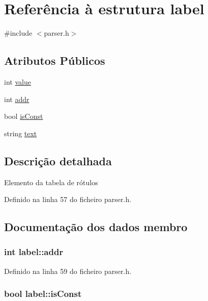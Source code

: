 \hypertarget{structlabel}{\section{Referência à estrutura label}
\label{structlabel}
}


{\ttfamily \#include $<$parser.\-h$>$}

\subsection*{Atributos Públicos}
\begin{DoxyCompactItemize}
\item 
int \hyperlink{structlabel_ac0cdaf20932b7fe75988a1d08510b72c}{value}
\item 
int \hyperlink{structlabel_af670c52b4f6b3aeaadc0ec95334e6e52}{addr}
\item 
bool \hyperlink{structlabel_a151d07ba85d0364ba39e2235d1c33b82}{is\-Const}
\item 
string \hyperlink{structlabel_a119fc486bd92631742a9fe2cf278d4df}{text}
\end{DoxyCompactItemize}


\subsection{Descrição detalhada}
Elemento da tabela de rótulos 

Definido na linha 57 do ficheiro parser.\-h.



\subsection{Documentação dos dados membro}
\hypertarget{structlabel_af670c52b4f6b3aeaadc0ec95334e6e52}{
\subsubsection[{addr}]{\setlength{\rightskip}{0pt plus 5cm}int label\-::addr}}\label{structlabel_af670c52b4f6b3aeaadc0ec95334e6e52}


Definido na linha 59 do ficheiro parser.\-h.

\hypertarget{structlabel_a151d07ba85d0364ba39e2235d1c33b82}{
\subsubsection[{is\-Const}]{\setlength{\rightskip}{0pt plus 5cm}bool label\-::is\-Const}}\label{structlabel_a151d07ba85d0364ba39e2235d1c33b82}


